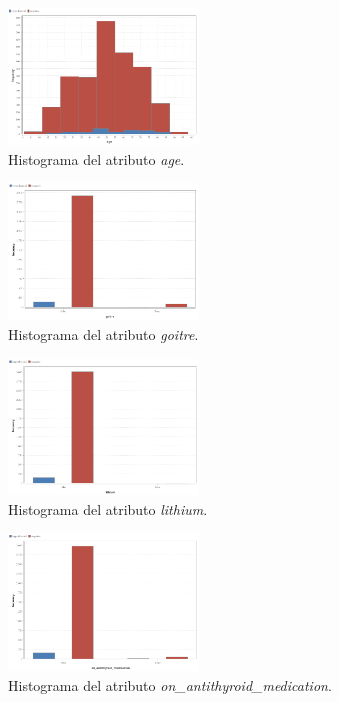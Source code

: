 \documentclass[osajnl,twocolumn,showpacs,superscriptaddress,10pt,floatfix]{revtex4-1} %
\begin{document}
\begin{figure}[H]
    \centering
    \includegraphics[width=0.45\textwidth]{analysis/histogram_age2}
    \caption{Histograma del atributo \textit{age}.}
    \label{figure:histogram_age2}
\end{figure}

\begin{figure}[H]
    \centering
    \includegraphics[width=0.45\textwidth]{analysis/histogram_goitre}
    \caption{Histograma del atributo \textit{goitre}.}
    \label{figure:histogram_goitre}
\end{figure}

\begin{figure}[H]
    \centering
    \includegraphics[width=0.45\textwidth]{analysis/histogram_lithium}
    \caption{Histograma del atributo \textit{lithium}.}
    \label{figure:histogram_lithium}
\end{figure}

\begin{figure}[H]
    \centering
    \includegraphics[width=0.45\textwidth]{analysis/histogram_on_antithyroid_medication}
    \caption{Histograma del atributo \textit{on\_antithyroid\_medication}.}
    \label{figure:on_antithyroid_medication}
\end{figure}
\end{document}
